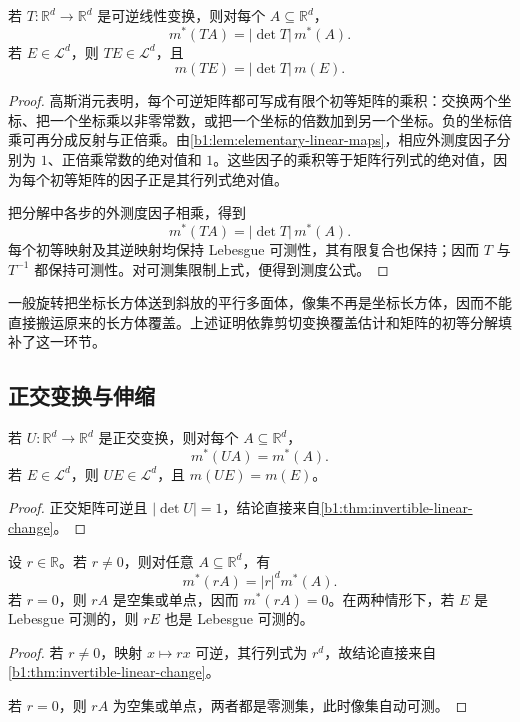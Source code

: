 \begin{theorem}
\label{b1:thm:invertible-linear-change}
若 \(T:\mathbb R^d\to\mathbb R^d\) 是可逆线性变换，则对每个 \(A\subseteq\mathbb R^d\)，
\[
m^*(TA)=|\det T|\,m^*(A).
\]
若 \(E\in\mathcal L^d\)，则 \(TE\in\mathcal L^d\)，且
\[
m(TE)=|\det T|\,m(E).
\]
\end{theorem}
\begin{proof}
高斯消元表明，每个可逆矩阵都可写成有限个初等矩阵的乘积：交换两个坐标、把一个坐标乘以非零常数，或把一个坐标的倍数加到另一个坐标。负的坐标倍乘可再分成反射与正倍乘。由\cref{b1:lem:elementary-linear-maps}，相应外测度因子分别为 \(1\)、正倍乘常数的绝对值和 \(1\)。这些因子的乘积等于矩阵行列式的绝对值，因为每个初等矩阵的因子正是其行列式绝对值。

把分解中各步的外测度因子相乘，得到
\[
m^*(TA)=|\det T|\,m^*(A).
\]
每个初等映射及其逆映射均保持 Lebesgue 可测性，其有限复合也保持；因而 \(T\) 与 \(T^{-1}\) 都保持可测性。对可测集限制上式，便得到测度公式。
\end{proof}

一般旋转把坐标长方体送到斜放的平行多面体，像集不再是坐标长方体，因而不能直接搬运原来的长方体覆盖。上述证明依靠剪切变换覆盖估计和矩阵的初等分解填补了这一环节。

\subsection{正交变换与伸缩}
\label{b1:subsec:030403}

\begin{corollary}
\label{b1:cor:orthogonal-invariance}
若 \(U:\mathbb R^d\to\mathbb R^d\) 是正交变换，则对每个 \(A\subseteq\mathbb R^d\)，
\[
m^*(UA)=m^*(A).
\]
若 \(E\in\mathcal L^d\)，则 \(UE\in\mathcal L^d\)，且 \(m(UE)=m(E)\)。
\end{corollary}
\begin{proof}
正交矩阵可逆且 \(|\det U|=1\)，结论直接来自\cref{b1:thm:invertible-linear-change}。
\end{proof}

\begin{proposition}
\label{b1:prop:scaling}
设 \(r\in\mathbb R\)。若 \(r\ne0\)，则对任意 \(A\subseteq\mathbb R^d\)，有
\[
m^*(rA)=|r|^d m^*(A).
\]
若 \(r=0\)，则 \(rA\) 是空集或单点，因而 \(m^*(rA)=0\)。在两种情形下，若 \(E\) 是 Lebesgue 可测的，则 \(rE\) 也是 Lebesgue 可测的。
\end{proposition}
\begin{proof}
若 \(r\ne0\)，映射 \(x\mapsto rx\) 可逆，其行列式为 \(r^d\)，故结论直接来自\cref{b1:thm:invertible-linear-change}。

若 \(r=0\)，则 \(rA\) 为空集或单点，两者都是零测集，此时像集自动可测。
\end{proof}

